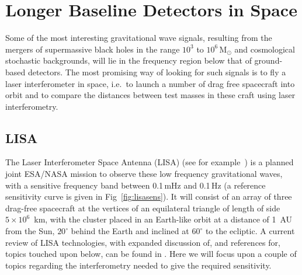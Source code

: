 \documentclass{article}
\begin{document}

\newpage

\section{Longer Baseline Detectors in Space}
\label{section:space}

Some of the most interesting gravitational wave signals, resulting from the
mergers of supermassive black holes in the range $10^3$ to $10^6$\,M$_{\odot}$
and cosmological stochastic backgrounds, will lie in the frequency region below
that of ground-based detectors. The most promising way of looking for such
signals is to fly a laser interferometer in space, i.e.\ to launch a number of
drag free spacecraft into orbit and to compare the distances between test
masses in these craft using laser interferometry.

\subsection{LISA}
The Laser Interferometer Space Antenna (LISA) (see
for example~\cite{LISAsymposium, NASAweb, ESAweb}) is a planned joint ESA/NASA
mission to observe these low frequency gravitational waves, with a sensitive
frequency band between 0.1\,mHz and 0.1\,Hz (a reference sensitivity curve is
given in Fig~\ref{fig:lisasens}). It will consist of an array of three drag-free
spacecraft at the vertices of an equilateral triangle of length of side
$5\times10^6$~km, with the cluster placed in an Earth-like orbit at a distance
of 1~AU from the Sun, $20^{\circ}$ behind the Earth and inclined at $60^{\circ}$
to the ecliptic. A current review of LISA technologies, with expanded discussion
of, and references for, topics touched upon below, can be found in
\cite{Jennrich:2009}. Here we will focus upon a couple of topics regarding the
interferometry needed to give the required sensitivity.
\end{document}
